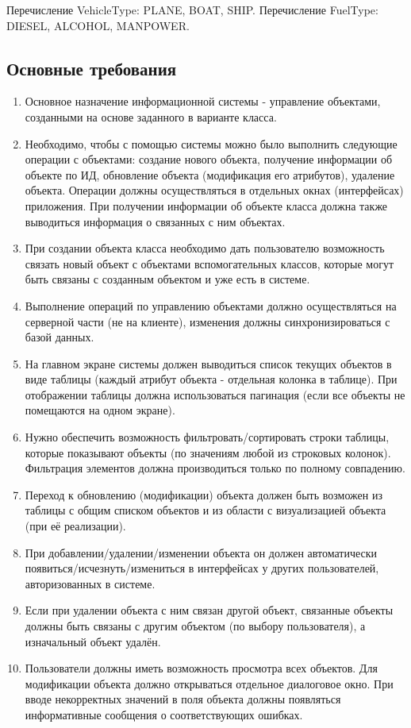 \documentclass[14pt,a4paper]{extarticle}
\begin{document}
Перечисление VehicleType: PLANE, BOAT, SHIP. Перечисление FuelType: DIESEL, ALCOHOL, MANPOWER.

\subsection*{Основные требования}
\begin{enumerate}
\item Основное назначение информационной системы - управление объектами, созданными на основе заданного в варианте класса.
\item Необходимо, чтобы с помощью системы можно было выполнить следующие операции с объектами: создание нового объекта, получение информации об объекте по ИД, обновление объекта (модификация его атрибутов), удаление объекта. Операции должны осуществляться в отдельных окнах (интерфейсах) приложения. При получении информации об объекте класса должна также выводиться информация о связанных с ним объектах.
\item При создании объекта класса необходимо дать пользователю возможность связать новый объект с объектами вспомогательных классов, которые могут быть связаны с созданным объектом и уже есть в системе.
\item Выполнение операций по управлению объектами должно осуществляться на серверной части (не на клиенте), изменения должны синхронизироваться с базой данных.
\item На главном экране системы должен выводиться список текущих объектов в виде таблицы (каждый атрибут объекта - отдельная колонка в таблице). При отображении таблицы должна использоваться пагинация (если все объекты не помещаются на одном экране).
\item Нужно обеспечить возможность фильтровать/сортировать строки таблицы, которые показывают объекты (по значениям любой из строковых колонок). Фильтрация элементов должна производиться только по полному совпадению.
\item Переход к обновлению (модификации) объекта должен быть возможен из таблицы с общим списком объектов и из области с визуализацией объекта (при её реализации).
\item При добавлении/удалении/изменении объекта он должен автоматически появиться/исчезнуть/измениться в интерфейсах у других пользователей, авторизованных в системе.
\item Если при удалении объекта с ним связан другой объект, связанные объекты должны быть связаны с другим объектом (по выбору пользователя), а изначальный объект удалён.
\item Пользователи должны иметь возможность просмотра всех объектов. Для модификации объекта должно открываться отдельное диалоговое окно. При вводе некорректных значений в поля объекта должны появляться информативные сообщения о соответствующих ошибках.
\end{enumerate}
\end{document}
